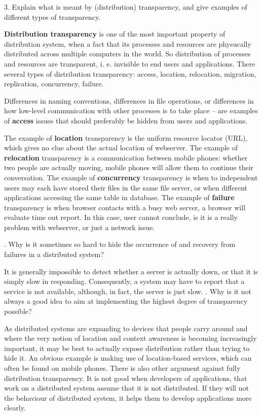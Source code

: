 \documentclass[12pt,a4paper]{report}
\begin{document}
\bigbreak

3. Explain what is meant by (distribution) transparency, and give examples of different types of transparency.

\textbf{Distribution transparency} is one of the most important property of distribution system, when a fact that its processes and resources are physucally distributed across multiple computers in the world. So distribution of processes and resources are transparent, i. e. invisible to end users and applications. There several types of distribution transparency: access, location, relocation, migration, replication, concurrency, failure.

Differences in naming conventions, differences in file operations, or differences in how low-level communication with other processes is to take place -- are examples of \textbf{access} issues that should preferably be hidden from users and applications.

The example of \textbf{location} transparency is the uniform resource locator (URL), which gives no clue about the actual location of webserver.
The example of \textbf{relocation} transparency is a communication between mobile phones: whether two people are actually moving, mobile phones will allow them to continue their conversation. 
The example of  \textbf{concurrency} transparency is when to independent users may each have stored their files in the same file server, or when different applications accessing the same table in database.
The example of  \textbf{failure} transparency is when browser contacts with a busy web server, a browser will evaluate time out report. In this case, user cannot conclude, is it is a really problem with webserver, or just a network issue.

. Why is it sometimes so hard to hide the occurrence of and recovery from failures in a distributed system?

It is generally impossible to detect whether a server is actually down, or that it is simply slow in responding. Consequently, a system may have to report that a service is not available, although, in fact, the server is just slow.
. Why is it not always a good idea to aim at implementing the highest degree of transparency possible?

As distributed systems are expanding to devices that people carry around and where the very notion of location and context awareness is becoming increasingly important, it may be best to actually expose distribution rather than trying to hide it. An obvious example is making use of location-based services, which can often be found on mobile phones. There is also other argument against fully distribution transparency. It is not good when developers of applications, that work on a distributed system assume that it is not distributed. If they will not the behaviour of distributed system, it helps them to develop applications more clearly.
\bigbreak
\end{document}

